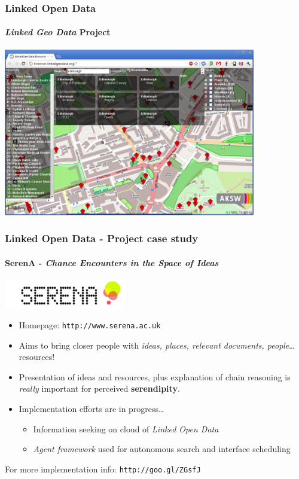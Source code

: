 \documentclass{beamer}
\begin{document}
\begin{frame}
\frametitle{Linked Open Data}
\framesubtitle{\emph{Linked Geo Data} Project}

\begin{center}
\includegraphics[width=110mm]{images/osm.pdf}
\end{center}

\end{frame}


\begin{frame}[fragile]
\frametitle{Linked Open Data - Project case study}
\framesubtitle{SerenA - \emph{Chance Encounters in the Space of Ideas}}


\begin{center}
\includegraphics[width=0.4\textwidth]{images/serena-logo.pdf}
\end{center}

\begin{itemize}
\item Homepage: \texttt{http://www.serena.ac.uk}
\item Aims to bring closer people with \emph{ideas, places, relevant
  documents, people}\ldots resources!
\item Presentation of ideas and resources, plus explanation of chain
  reasoning is \emph{really} important for perceived
  \textbf{serendipity}.
\item Implementation efforts are in progress\ldots
  
  \begin{itemize}
  \item Information seeking on cloud of \emph{Linked Open Data}
  \item \emph{Agent framework} used for autonomous search and interface scheduling
  \end{itemize}
  
\end{itemize}

For more implementation info: \texttt{http://goo.gl/ZGsfJ}

\end{frame}
\end{document}
